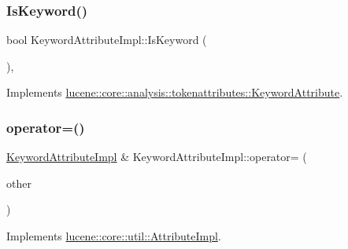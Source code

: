 \subsubsection{\texorpdfstring{Is\+Keyword()}{IsKeyword()}}
{\footnotesize\ttfamily bool Keyword\+Attribute\+Impl\+::\+Is\+Keyword (\begin{DoxyParamCaption}{ }\end{DoxyParamCaption})\hspace{0.3cm}{\ttfamily [override]}, {\ttfamily [virtual]}}



Implements \mbox{\hyperlink{classlucene_1_1core_1_1analysis_1_1tokenattributes_1_1KeywordAttribute_af6270bf727324f1809a18a1fc9b1a27c}{lucene\+::core\+::analysis\+::tokenattributes\+::\+Keyword\+Attribute}}.

\mbox{\label{classlucene_1_1core_1_1analysis_1_1tokenattributes_1_1KeywordAttributeImpl_a30228ce41cc678c1cb85c2fb1179f447}} 
\subsubsection{\texorpdfstring{operator=()}{operator=()}\hspace{0.1cm}{\footnotesize\ttfamily [1/2]}}
{\footnotesize\ttfamily \mbox{\hyperlink{classlucene_1_1core_1_1analysis_1_1tokenattributes_1_1KeywordAttributeImpl}{Keyword\+Attribute\+Impl}} \& Keyword\+Attribute\+Impl\+::operator= (\begin{DoxyParamCaption}\item[{const \mbox{\hyperlink{classlucene_1_1core_1_1util_1_1AttributeImpl}{lucene\+::core\+::util\+::\+Attribute\+Impl}} \&}]{other }\end{DoxyParamCaption})\hspace{0.3cm}{\ttfamily [virtual]}}



Implements \mbox{\hyperlink{classlucene_1_1core_1_1util_1_1AttributeImpl_ab032e399d03ce2f58c76881cf2b92325}{lucene\+::core\+::util\+::\+Attribute\+Impl}}.

